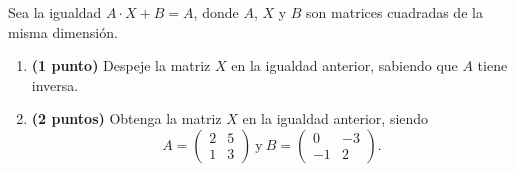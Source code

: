 
Sea la igualdad $A\cdot X+B=A$, donde $A$, $X$ y $B$ son matrices cuadradas de la misma dimensión.
\begin{enumerate}[label=\alph*)]
\item \textbf{(1 punto)} Despeje la matriz $X$ en la igualdad anterior, sabiendo que $A$ tiene inversa.
\item \textbf{(2 puntos)} Obtenga la matriz $X$ en la igualdad anterior, siendo
\[
A=\begin{pmatrix}2&5\\1&3\end{pmatrix}\ \text{y}\ B=\begin{pmatrix}0&-3\\-1&2\end{pmatrix}.
\]
\end{enumerate}

